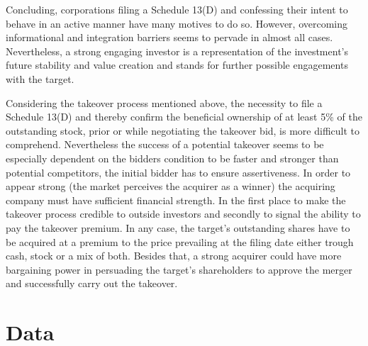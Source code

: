 \documentclass[12pt]{article}
\begin{document}
Concluding, corporations filing a Schedule 13(D) and confessing their intent to behave in an active manner have many motives to do so. However, overcoming informational and integration barriers seems to pervade in almost all cases. Nevertheless, a strong engaging investor is a representation of the investment's future stability and value creation and stands for further possible engagements with the target. 

Considering the takeover process mentioned above, the necessity to file a Schedule 13(D) and thereby confirm the beneficial ownership of at least 5\% of the outstanding stock, prior or while negotiating the takeover bid, is more difficult to comprehend. Nevertheless the success of a potential takeover seems to be especially dependent on the bidders condition to be faster and stronger than potential competitors, the initial bidder has to ensure assertiveness. In order to appear strong (the market perceives the acquirer as a winner) the acquiring company must have sufficient financial strength. In the first place to make the takeover process credible to outside investors and secondly to signal the ability to pay the takeover premium. In any case, the target's outstanding shares have to be acquired at a premium to the price prevailing at the filing date either trough cash, stock or a mix of both. Besides that, a strong acquirer could have more bargaining power in persuading the target's shareholders to approve the merger and successfully carry out the takeover. 

\section{Data}
\end{document}
